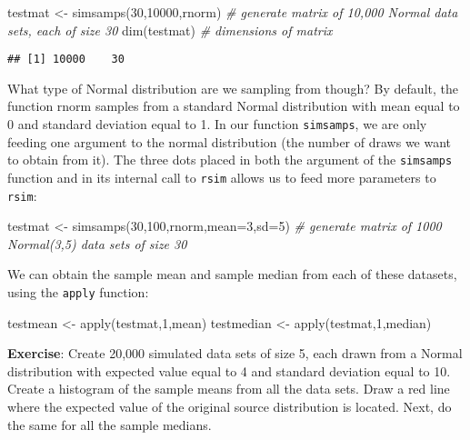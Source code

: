 \documentclass[
]{book}
\newenvironment{Shaded}{\begin{snugshade}}{\end{snugshade}}
\newcommand{\AttributeTok}[1]{\textcolor[rgb]{0.77,0.63,0.00}{#1}}
\newcommand{\CommentTok}[1]{\textcolor[rgb]{0.56,0.35,0.01}{\textit{#1}}}
\newcommand{\DecValTok}[1]{\textcolor[rgb]{0.00,0.00,0.81}{#1}}
\newcommand{\FunctionTok}[1]{\textcolor[rgb]{0.00,0.00,0.00}{#1}}
\newcommand{\NormalTok}[1]{#1}
\newcommand{\OtherTok}[1]{\textcolor[rgb]{0.56,0.35,0.01}{#1}}
\begin{document}
\begin{Shaded}
\begin{Highlighting}[]
\NormalTok{testmat }\OtherTok{\textless{}{-}} \FunctionTok{simsamps}\NormalTok{(}\DecValTok{30}\NormalTok{,}\DecValTok{10000}\NormalTok{,rnorm) }\CommentTok{\# generate matrix of 10,000 Normal data sets, each of size 30}
\FunctionTok{dim}\NormalTok{(testmat) }\CommentTok{\# dimensions of matrix}
\end{Highlighting}
\end{Shaded}

\begin{verbatim}
## [1] 10000    30
\end{verbatim}

What type of Normal distribution are we sampling from though? By default, the function rnorm samples from a standard Normal distribution with mean equal to 0 and standard deviation equal to 1. In our function \texttt{simsamps}, we are only feeding one argument to the normal distribution (the number of draws we want to obtain from it). The three dots placed in both the argument of the \texttt{simsamps} function and in its internal call to \texttt{rsim} allows us to feed more parameters to \texttt{rsim}:

\begin{Shaded}
\begin{Highlighting}[]
\NormalTok{testmat }\OtherTok{\textless{}{-}} \FunctionTok{simsamps}\NormalTok{(}\DecValTok{30}\NormalTok{,}\DecValTok{100}\NormalTok{,rnorm,}\AttributeTok{mean=}\DecValTok{3}\NormalTok{,}\AttributeTok{sd=}\DecValTok{5}\NormalTok{) }\CommentTok{\# generate matrix of 1000 Normal(3,5) data sets of size 30}
\end{Highlighting}
\end{Shaded}

We can obtain the sample mean and sample median from each of these datasets, using the \texttt{apply} function:

\begin{Shaded}
\begin{Highlighting}[]
\NormalTok{testmean }\OtherTok{\textless{}{-}} \FunctionTok{apply}\NormalTok{(testmat,}\DecValTok{1}\NormalTok{,mean)}
\NormalTok{testmedian }\OtherTok{\textless{}{-}} \FunctionTok{apply}\NormalTok{(testmat,}\DecValTok{1}\NormalTok{,median)}
\end{Highlighting}
\end{Shaded}

\textbf{Exercise}: Create 20,000 simulated data sets of size 5, each drawn from a Normal distribution with expected value equal to 4 and standard deviation equal to 10. Create a histogram of the sample means from all the data sets. Draw a red line where the expected value of the original source distribution is located. Next, do the same for all the sample medians.
\end{document}
